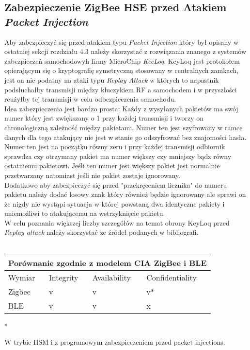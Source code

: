 \subsection{Zabezpieczenie ZigBee HSE przed Atakiem \textit{Packet Injection} }
\par
\tab Aby zabezpieczyć się przed atakiem typu \textit{Packet Injection} który był opisany w ostatniej sekcji rozdziału 4.3 należy skorzystać z rozwiązania znanego z systemów zabezpieczeń samochodowyh firmy MicroChip \textit{KeeLoq}. KeyLoq jest protokołem opierającym się o kryptografię symetryczną stosowany w centralnych zamkach, jest on nie podatny na ataki typu \textit{Replay Attack} w których to napastnik podsłuchałby transmisji między kluczykiem RF a samochodem i w przyszłości reużyłby tej transmisji w celu odbezpieczenia samochodu. \\
Idea zabezpieczenia jest bardzo prosta: Każdy z wysyłanych pakietów ma swój numer który jest zwiększany o 1 przy każdej transmisji i tworzy on chronologiczną zależność między pakietami. Numer ten jest szyfrowany w ramce danych dla tego atakujący nie jest w stanie go odszyfrować bez znajomości hasła. Numer ten jest na początku równy zeru i przy każdej transmisji odbiornik sprawdza czy otrzymany pakiet ma numer większy czy mniejszy bądz równy ostatniemu pakietowi. Jeśli ten numer jest większy pakiet jest normalnie przetwarzany natomiast jeśli nie pakiet zostaje ignorowany. \\
Dodatkowo aby zabezpieczyć się przed "przekręceniem licznika" do numeru pakietu należy dodać losowy znak który również będzie ignorowany ale sprawi on że nigdy nie wystąpi sytuacja w której powstaną dwa identyczne pakiety i uniemożliwi to atakującemu na wstrzyknięcie pakietu. \\
W celu poznania większej liczby szczegółów na temat obrony KeyLoq przed  \textit{Replay attack} należy skorzystać ze źródeł podanych w bibliografi. \\

\mbox{}\\
\begin{tabular}{ |p{3cm}||p{3cm}|p{3cm}|p{3cm}|  }
 \hline
 \multicolumn{4}{|c|}{Porównanie zgodnie z modelem CIA ZigBee i BLE} \\
 \hline
 Wymiar & Integrity & Availability & Confidentiality\\
 \hline
 Zigbee  & v  & v 	&   v*\\
 BLE 	 & v   & v  & x\\
 \hline
\end{tabular}
* {\small W trybie HSM i z programowym zabezpieczeniem przed packet injections. \par}  
\mbox{}\\


